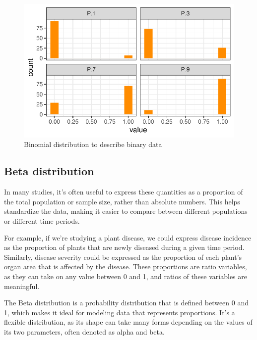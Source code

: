 \documentclass[
  letterpaper,
  DIV=11,
  numbers=noendperiod]{scrreprt}
\begin{document}
\begin{figure}[H]

{\centering \includegraphics{data-terminology_files/figure-pdf/fig-binomial-1.pdf}

}

\caption{\label{fig-binomial}Binomial distribution to describe binary
data}

\end{figure}

\hypertarget{beta-distribution}{%
\subsection{Beta distribution}\label{beta-distribution}}

In many studies, it's often useful to express these quantities as a
proportion of the total population or sample size, rather than absolute
numbers. This helps standardize the data, making it easier to compare
between different populations or different time periods.

For example, if we're studying a plant disease, we could express disease
incidence as the proportion of plants that are newly diseased during a
given time period. Similarly, disease severity could be expressed as the
proportion of each plant's organ area that is affected by the disease.
These proportions are ratio variables, as they can take on any value
between 0 and 1, and ratios of these variables are meaningful.

The Beta distribution is a probability distribution that is defined
between 0 and 1, which makes it ideal for modeling data that represents
proportions. It's a flexible distribution, as its shape can take many
forms depending on the values of its two parameters, often denoted as
alpha and beta.
\end{document}

